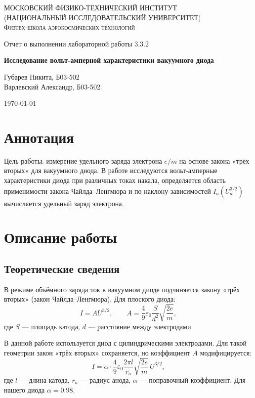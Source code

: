 \documentclass[a4paper]{article}
\begin{document}
	
	\begin{titlepage}
		\centering
		{\scshape\Large МОСКОВСКИЙ ФИЗИКО-ТЕХНИЧЕСКИЙ ИНСТИТУТ \\
			(НАЦИОНАЛЬНЫЙ ИССЛЕДОВАТЕЛЬСКИЙ УНИВЕРСИТЕТ)\\
			Физтех-школа аэрокосмических технологий}
		
		\vspace{4cm}
		{\LARGE Отчет о выполнении лабораторной работы 3.3.2}
		\vspace{1cm}
		
		{\huge\bf Исследование вольт-амперной характеристики вакуумного диода}
		
		\vspace{1cm}
		\vfill
		
		\begin{flushright}
			{\LARGE Губарев Никита, Б03-502} \\
			{\LARGE Варлевский Александр, Б03-502}
		\end{flushright}
		\vfill 
		\today
	\end{titlepage}
	
	\tableofcontents
	
	\section{Аннотация}
	Цель работы: измерение удельного заряда электрона $e/m$ на основе закона «трёх вторых» для вакуумного диода. В работе исследуются вольт-амперные характеристики диода при различных токах накала, определяется область применимости закона Чайлда–Ленгмюра и по наклону зависимостей $I_a(U_a^{3/2})$ вычисляется удельный заряд электрона.
	
	\section{Описание работы}
	
	\subsection{Теоретические сведения}
	
	В режиме объёмного заряда ток в вакуумном диоде подчиняется закону «трёх вторых» (закон Чайлда–Ленгмюра). Для плоского диода:
	\[
	I = A U^{3/2}, \qquad A = \frac{4}{9} \varepsilon_0 \frac{S}{d^2} \sqrt{\frac{2e}{m}},
	\]
	где $S$ — площадь катода, $d$ — расстояние между электродами.
	
	В данной работе используется диод с цилиндрическими электродами. Для такой геометрии закон «трёх вторых» сохраняется, но коэффициент $A$ модифицируется:
	\[
	I = \alpha \cdot \frac{4}{9} \varepsilon_0 \frac{2\pi l}{r_a} \sqrt{\frac{2e}{m}} \, U^{3/2},
	\]
	где $l$ — длина катода, $r_a$ — радиус анода, $\alpha$ — поправочный коэффициент. Для нашего диода $\alpha = 0.98$.
	
\end{document}
